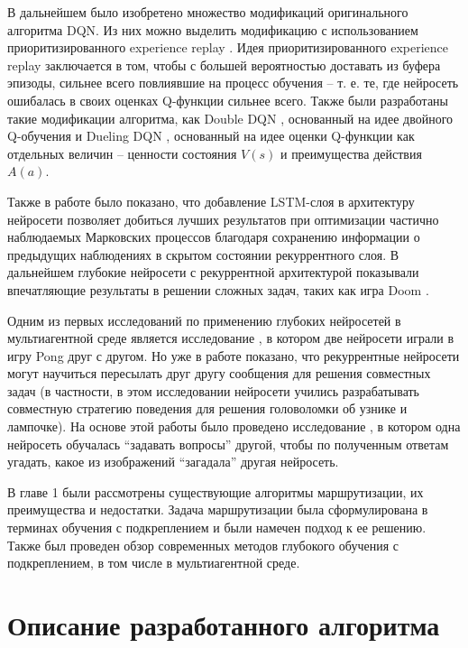 \documentclass[specification, annotation]{itmo-student-thesis}
\begin{document}
В дальнейшем было изобретено множество модификаций оригинального алгоритма DQN.
Из них можно выделить модификацию с использованием приоритизированного
experience replay \cite{schaul2015prioritized}. Идея приоритизированного
experience replay заключается в том, чтобы с большей вероятностью доставать из
буфера эпизоды, сильнее всего повлиявшие на процесс обучения -- т. е. те,
где нейросеть ошибалась в своих оценках Q-функции сильнее всего.
Также были разработаны такие модификации алгоритма, как Double
DQN \cite{van2016deep}, основанный на идее двойного
Q-обучения \cite{hasselt2010double} и Dueling DQN \cite{wang2015dueling},
основанный на идее оценки Q-функции как отдельных величин -- ценности состояния
$V(s)$ и преимущества действия $A(a)$.

Также в работе \cite{hausknecht2015deep} было показано, что добавление
LSTM-слоя \cite{hochreiter1997long} в архитектуру нейросети позволяет добиться
лучших результатов при оптимизации частично наблюдаемых Марковских процессов
благодаря сохранению информации о предыдущих наблюдениях в скрытом состоянии
рекуррентного слоя. В дальнейшем глубокие нейросети с рекуррентной архитектурой
показывали впечатляющие результаты в решении сложных задач, таких как игра
Doom \cite{lample2016playing}.

Одним из первых исследований по применению глубоких нейросетей в мультиагентной
среде является исследование \cite{tampuu2017multiagent}, в котором две нейросети
играли в игру Pong друг с другом. Но уже в работе \cite{foerster2016learning}
показано, что рекуррентные нейросети могут научиться пересылать друг другу сообщения для решения
совместных задач (в частности, в этом исследовании нейросети учились
разрабатывать совместную стратегию поведения для решения головоломки об узнике и
лампочке). На основе этой работы было проведено исследование
\cite{jorge2016learning}, в котором одна нейросеть обучалась
``задавать вопросы'' другой, чтобы по полученным ответам угадать, какое из
изображений ``загадала'' другая нейросеть.

\chapterconclusion

В главе 1 были рассмотрены существующие алгоритмы маршрутизации, их преимущества
и недостатки. Задача маршрутизации была сформулирована в терминах обучения с
подкреплением и были намечен подход к ее решению. Также был проведен обзор
современных методов глубокого обучения с подкреплением, в том числе в
мультиагентной среде.

\finishrelatedwork

\chapter{Описание разработанного алгоритма}
\end{document}
